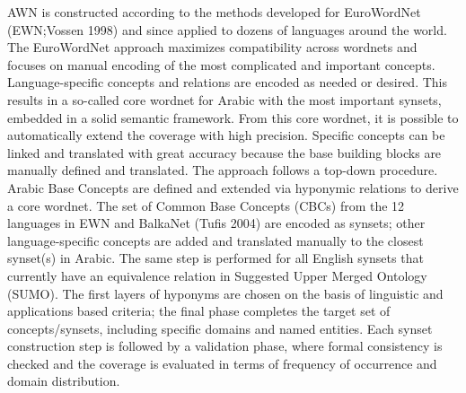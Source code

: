 AWN is constructed according to the methods developed for EuroWordNet (EWN;Vossen 1998) and since applied to dozens of languages around the world. The EuroWordNet approach maximizes compatibility across wordnets and focuses on manual encoding of the most complicated and important concepts. 
Language-specific concepts and relations are encoded as needed or desired. This results in a so-called core wordnet for Arabic with the most important synsets, embedded in a solid semantic framework. From this core wordnet, it is possible to automatically extend the coverage with high precision. Specific concepts can be linked and translated with great accuracy because the base building blocks are manually defined and translated. 
The approach follows a top-down procedure. Arabic Base Concepts are defined and extended via hyponymic relations to derive a core wordnet. The set of Common Base Concepts (CBCs) from the 12 languages in EWN and BalkaNet (Tufis 2004) are encoded as synsets; other language-specific concepts are added and translated manually to the closest synset(s) in Arabic. The same step is performed for all English synsets that currently have an equivalence relation in Suggested Upper Merged Ontology (SUMO).
The first layers of hyponyms are chosen on the basis of linguistic and applications based criteria; the final phase completes the target set of concepts/synsets, including specific domains and named entities. Each synset construction step is followed by a validation phase, where formal consistency is checked and the coverage is evaluated in terms of frequency of occurrence and domain distribution.

